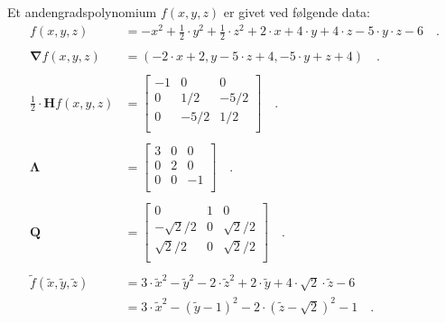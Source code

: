 \begin{example} \label{exampHypTo3D01}
Et andengradspolynomium $f(x,y,z)$ er givet ved følgende data:
\begin{equation}
\begin{aligned}
f(x,y,z) &= -x^{2} + \frac{1}{2}\cdot y^{2} + \frac{1}{2}\cdot z^{2} + 2\cdot x + 4\cdot y + 4\cdot z - 5 \cdot y \cdot z -6         \quad . \\  \\
\bm{\nabla}f(x,y,z) &= (-2\cdot x  +2,  y - 5\cdot z+4, -5\cdot y + z +4  ) \quad . \\  \\
\frac{1}{2}\cdot \mathbf{H}f(x,y,z) &= \left[
                     \begin{array}{ccc}
                       -1 & 0 & 0\\
                       0 & 1/2 & -5/2\\
                       0 & -5/2 & 1/2\\
                     \end{array}
                   \right] \quad . \\  \\
\bm{\Lambda} &= \left[
                     \begin{array}{ccc}
                       3 & 0 & 0 \\
                       0 & 2& 0 \\
                       0 & 0 & -1 \\
                     \end{array}
                   \right] \quad . \\  \\
\mathbf{Q} &= \left[
                     \begin{array}{ccc}
                       0 & 1 & 0 \\
                       -\sqrt{2}/2& 0&  \sqrt{2}/2\\
                       \sqrt{2}/2 &0 &  \sqrt{2}/2\\
                     \end{array}
                   \right] \quad . \\   \\
\widetilde{f}(\widetilde{x}, \widetilde{y}, \widetilde{z}) & = 3\cdot \widetilde{x}^{2} - \widetilde{y}^{2} - 2\cdot \widetilde{z}^{2} + 2 \cdot \widetilde{y}  +  4\cdot \sqrt{2} \cdot \widetilde{z} - 6 \\
&= 3 \cdot \widetilde{x}^{2} - \left(\widetilde{y} - 1 \right)^{2} - 2 \cdot \left(\widetilde{z}- \sqrt{2} \right)^{2}-1 \quad.

\end{aligned}
\end{equation}
\end{example}
